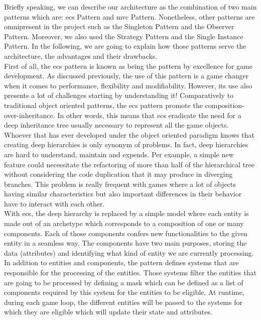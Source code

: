 Briefly speaking, we can describe our architecture as the combination of two main patterns which are: \gls{ecs} Pattern and \gls{mvc} Pattern. Nonetheless, other patterns are omnipresent in the project such as the Singleton Pattern and the Observer Pattern. Moreover, we also used the Strategy Pattern and the Single Instance Pattern. In the following, we are going to explain how those patterns serve the architecture, the advantages and their drawbacks. \\

First of all, the \gls{ecs} pattern is known as being the pattern by excellence for game development. As discussed previously, the use of this pattern is a game changer when it comes to performance, flexibility and modifiability. However, its use also presents a lot of challenges starting by understanding it! Comparatively to traditional object oriented patterns, the \gls{ecs} pattern promote the composition-over-inheritance. In other words, this means that \gls{ecs} eradicate the need for a deep inheritance tree usually necessary to represent all the game objects. Whoever that has ever developed under the object oriented paradigm knows that creating deep hierarchies is only synonym of problems. In fact, deep hierarchies are hard to understand, maintain and expends. Per example, a simple new feature could necessitate the refactoring of more than half of the hierarchical tree without considering the code duplication that it may produce in diverging branches. This problem is really frequent with games where a lot of objects having similar characteristics but also important differences in their behavior have to interact with each other. \\

With \gls{ecs}, the deep hierarchy is replaced by a simple model where each entity is made out of an archetype which corresponds to a composition of one or many components. Each of those components confers new functionalities to the given entity in a seamless way. The components have two main purposes, storing the data (attributes) and identifying what kind of entity we are currently processing. In addition to entities and components, the pattern defines systems that are responsible for the processing of the entities. Those systems filter the entities that are going to be processed by defining a mask which can be defined as a list of components required by this system for the entities to be eligible. At runtime, during each game loop, the different entities will be passed to the systems for which they are eligible which will update their state and attributes. \cite{wiki:ecs} \\

